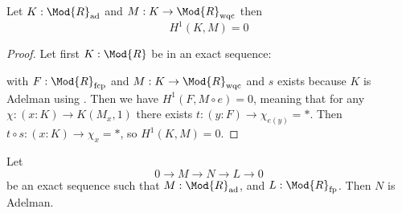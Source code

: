 \begin{lemma}
  \label{H1-on-adelman-module}
  Let $K:\Mod{R}_{\mathrm{ad}}$ and $M:K\to \Mod{R}_\mathrm{wqc}$ then
  \[
    H^1(K,M)=0
  \]
\end{lemma}

\begin{proof}
  Let first $K:\Mod{R}$ be in an exact sequence:
  \begin{center}
  \end{center}
  with $F:\Mod{R}_\mathrm{fcp}$ and $M:K\to\Mod{R}_{\mathrm{wqc}}$ and $s$ exists because $K$ is Adelman using .
  Then we have $H^1(F,M\circ e)=0$, meaning that for any $\chi:(x:K)\to K(M_x,1)$ there exists $t:(y:F)\to \chi_{e(y)}=\ast$. Then $t\circ s:(x:K)\to \chi_x=\ast$, so $H^1(K,M)=0$.
\end{proof}

\begin{proposition}
  \label{fp-extension-adelman}
  Let
  \[
    0\to M \to N \to L \to 0
  \]
  be an exact sequence such that $M :\Mod{R}_{\mathrm{ad}}$, and $L : \Mod{R}_{\mathrm{fp}}$.
  Then $N$ is Adelman.
\end{proposition}

